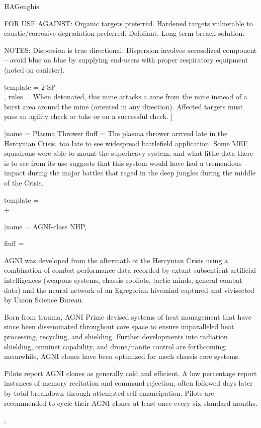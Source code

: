 \begin{mech}{HA}{Genghis}
{FOR USE AGAINST: Organic targets preferred. Hardened targets vulnerable to caustic/corrosive degradation preferred. Defoliant. Long-term breach solution.

NOTES: Dispersion is true directional. Dispersion involves aerosolized component -- avoid blue on blue by supplying end-users with proper respiratory equipment (noted on canister).}

template = {2 SP\\
\Mine, }
rules = {When detonated, this mine attacks a  zone from the mine instead of a burst area around the mine (oriented in any direction). Affected targets must pass an agility check or take  or  on a successful check.}
]

\gearRules
[name = {Plasma Thrower}
fluff = {The plasma thrower arrived late in the Hercynian Crisis, too late to see widespread battlefield application. Some MEF squadrons were able to mount the superheavy system, and what little data there is to see from its use suggests that this system would have had a tremendous impact during the major battles that raged in the deep jungles during the middle of the Crisis.}

template = {\Superheavy \CQB \\
 + }

\gearBox
[name = {AGNI-class NHP},

fluff = {AGNI was developed from the aftermath of the Hercynian Crisis using a combination of combat performance data recorded by extant subsentient artificial intelligences (weapons systems, chassis copilots, tactic-minds, general combat data) and the neural network of an Egregorian hivemind captured and vivisected by Union Science Bureau.

Born from trauma, AGNI Prime devised systems of heat management that have since been disseminated throughout core space to ensure unparalleled heat processing, recycling, and shielding. Further developments into radiation shielding, omninet capability, and drone/nanite control are forthcoming; meanwhile, AGNI clones have been optimized for mech chassis core systems.

Pilots report AGNI clones as generally cold and efficient. A low percentage report instances of memory recitation and command rejection, often followed days later by total breakdown through attempted self-emancipation. Pilots are recommended to cycle their AGNI clones at least once every six standard months.},


\end{mech}
